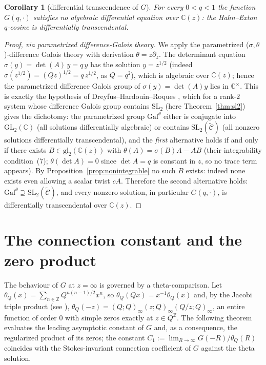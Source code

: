 \documentclass[11pt]{article}
\theoremstyle{plain}
\newtheorem{corollary}[theorem]{Corollary}
\theoremstyle{definition}
\theoremstyle{remark}
\newcommand{\Z}{\mathbb{Z}}
\newcommand{\C}{\mathbb{C}}
\begin{document}
\begin{corollary}[differential transcendence of $G$]
\label{cor:hypertranscendence}
For every $0<q<1$ the function $G(q,\cdot)$ satisfies no algebraic differential equation over
$\C(z)$: the Hahn--Exton $q$-cosine is differentially transcendental.
\end{corollary}

\begin{proof}[Proof, via parametrized difference-Galois theory]
We apply the parametrized ($\sigma,\theta$)-difference Galois theory with derivation
$\theta=z\partial_z$. The determinant equation $\sigma(y)=\det(A)\,y=q\,y$ has the solution
$y=z^{1/2}$ (indeed $\sigma(z^{1/2})=(Qz)^{1/2}=q\,z^{1/2}$, as $Q=q^2$), which is algebraic over $\C(z)$; hence the parametrized difference Galois group of $\sigma(y)=\det(A)y$
lies in $\C^\times$. This is exactly the hypothesis of Dreyfus--Hardouin--Roques
\cite[Prop.~2.9]{DHR2018}, which for a rank-$2$ system whose difference Galois group contains
$\mathrm{SL}_2$ (here Theorem~\ref{thm:sl2}) gives the dichotomy: the parametrized group
$\mathrm{Gal}^\theta$ either is conjugate into $\mathrm{GL}_2(\C)$ (all solutions differentially
algebraic) or contains $\mathrm{SL}_2(\widetilde{\mathcal C})$ (all nonzero solutions
differentially transcendental), and the \emph{first} alternative holds if and only if there exists
$B\in\mathrm{gl}_2(\C(z))$ with $\theta(A)=\sigma(B)A-AB$ (their integrability condition~(7);
$\theta(\det A)=0$ since $\det A=q$ is constant in $z$, so no trace term appears). By
Proposition~\ref{prop:nonintegrable} no such $B$ exists: indeed none exists even allowing a
scalar twist $cA$. Therefore the second alternative holds:
$\mathrm{Gal}^\theta\supseteq\mathrm{SL}_2(\widetilde{\mathcal C})$, and every nonzero solution,
in particular $G(q,\cdot)$, is differentially transcendental over $\C(z)$.
\end{proof}


\section{The connection constant and the zero product}\label{sec:zeroproduct}

The behaviour of $G$ at $z=\infty$ is governed by a theta-comparison. Let
$\theta_Q(x)=\sum_{n\in\Z}Q^{n(n-1)/2}x^n$, so $\theta_Q(Qx)=x^{-1}\theta_Q(x)$ and, by the Jacobi
triple product \cite{Jacobi1829} (see \cite[(1.6.1)]{GR}),
$\theta_Q(-z)=(Q;Q)_\infty(z;Q)_\infty(Q/z;Q)_\infty$, an entire function of order $0$
with simple zeros exactly at $z\in Q^{\Z}$. The following theorem evaluates the leading asymptotic
constant of $G$ and, as a consequence, the regularized product of its zeros; the constant
$C_1:=\lim_{R\to\infty}G(-R)/\theta_Q(R)$ coincides with the Stokes-invariant connection coefficient of
$G$ against the theta solution.
\end{document}
